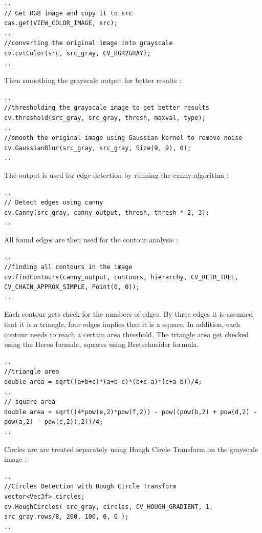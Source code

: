 \documentclass[main.tex]{subfiles}
\begin{document}
\begin{lstlisting}
..
// Get RGB image and copy it to src
cas.get(VIEW_COLOR_IMAGE, src); 
..
//converting the original image into grayscale
cv.cvtColor(src, src_gray, CV_BGR2GRAY);
..
\end{lstlisting}
Then smoothing the grayscale output for better results : 
\begin{lstlisting}
..
//thresholding the grayscale image to get better results
cv.threshold(src_gray, src_gray, thresh, maxval, type);
..
//smooth the original image using Gaussian kernel to remove noise
cv.GaussianBlur(src_gray, src_gray, Size(9, 9), 0);
..
\end{lstlisting}
The output is used for edge detection by running the canny-algorithm : 
\begin{lstlisting}
..
// Detect edges using canny
cv.Canny(src_gray, canny_output, thresh, thresh * 2, 3);
..
\end{lstlisting}
All found edges are then used for the contour analysis : 
\begin{lstlisting}
..
//finding all contours in the image
cv.findContours(canny_output, contours, hierarchy, CV_RETR_TREE, CV_CHAIN_APPROX_SIMPLE, Point(0, 0));
..
\end{lstlisting}

Each contour gets check for the numbers of edges. By three edges it is assumed that it is a triangle, four edges implies that it is a square. In addition, each contour needs to reach a certain area threshold. The triangle area get checked using the Heros formula, squares using Bretschneider formula. 

\begin{lstlisting}
..
//triangle area
double area = sqrt((a+b+c)*(a+b-c)*(b+c-a)*(c+a-b))/4;
..
// square area
double area = sqrt((4*pow(e,2)*pow(f,2)) - pow((pow(b,2) + pow(d,2) - pow(a,2) - pow(c,2)),2))/4;
..
\end{lstlisting}

Circles are are treated separately using Hough Circle Transform on the grayscale image : 

\begin{lstlisting}
..
//Circles Detection with Hough Circle Transform
vector<Vec3f> circles;
cv.HoughCircles( src_gray, circles, CV_HOUGH_GRADIENT, 1, src_gray.rows/8, 200, 100, 0, 0 );
..
\end{lstlisting}
\end{document}
